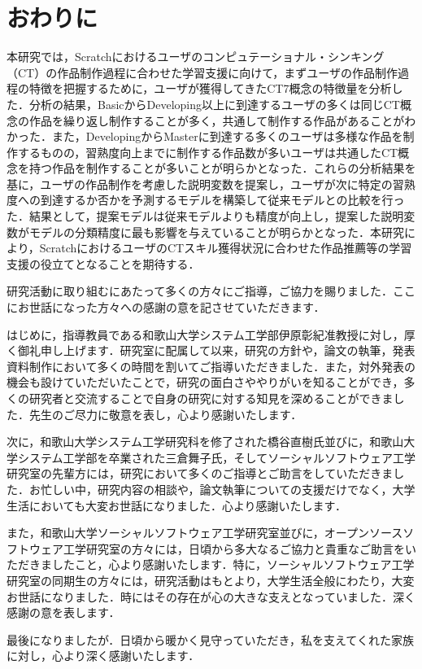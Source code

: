 \documentclass[11pt,dvipdfmx]{jreport}
\begin{document}
\chapter{おわりに}

本研究では，Scratchにおけるユーザのコンピュテーショナル・シンキング（CT）の作品制作過程に合わせた学習支援に向けて，まずユーザの作品制作過程の特徴を把握するために，ユーザが獲得してきたCT7概念の特徴量を分析した．分析の結果，BasicからDeveloping以上に到達するユーザの多くは同じCT概念の作品を繰り返し制作することが多く，共通して制作する作品があることがわかった．また，DevelopingからMasterに到達する多くのユーザは多様な作品を制作するものの，習熟度向上までに制作する作品数が多いユーザは共通したCT概念を持つ作品を制作することが多いことが明らかとなった．これらの分析結果を基に，ユーザの作品制作を考慮した説明変数を提案し，ユーザが次に特定の習熟度への到達するか否かを予測するモデルを構築して従来モデルとの比較を行った．結果として，提案モデルは従来モデルよりも精度が向上し，提案した説明変数がモデルの分類精度に最も影響を与えていることが明らかとなった．本研究により，ScratchにおけるユーザのCTスキル獲得状況に合わせた作品推薦等の学習支援の役立てとなることを期待する．

\begin{acknowledgements}

研究活動に取り組むにあたって多くの方々にご指導，ご協力を賜りました．ここにお世話になった方々への感謝の意を記させていただきます．

はじめに，指導教員である和歌山大学システム工学部伊原彰紀准教授に対し，厚く御礼申し上げます．研究室に配属して以来，研究の方針や，論文の執筆，発表資料制作において多くの時間を割いてご指導いただきました．また，対外発表の機会も設けていただいたことで，研究の面白さややりがいを知ることができ，多くの研究者と交流することで自身の研究に対する知見を深めることができました．先生のご尽力に敬意を表し，心より感謝いたします．

次に，和歌山大学システム工学研究科を修了された橋谷直樹氏並びに，和歌山大学システム工学部を卒業された三倉舞子氏，そしてソーシャルソフトウェア工学研究室の先輩方には，研究において多くのご指導とご助言をしていただきました．お忙しい中，研究内容の相談や，論文執筆についての支援だけでなく，大学生活においても大変お世話になりました．心より感謝いたします．

また，和歌山大学ソーシャルソフトウェア工学研究室並びに，オープンソースソフトウェア工学研究室の方々には，日頃から多大なるご協力と貴重なご助言をいただきましたこと，心より感謝いたします．特に，ソーシャルソフトウェア工学研究室の同期生の方々には，研究活動はもとより，大学生活全般にわたり，大変お世話になりました．時にはその存在が心の大きな支えとなっていました．深く感謝の意を表します．

最後になりましたが．日頃から暖かく見守っていただき，私を支えてくれた家族に対し，心より深く感謝いたします．

\end{acknowledgements}
\end{document}
